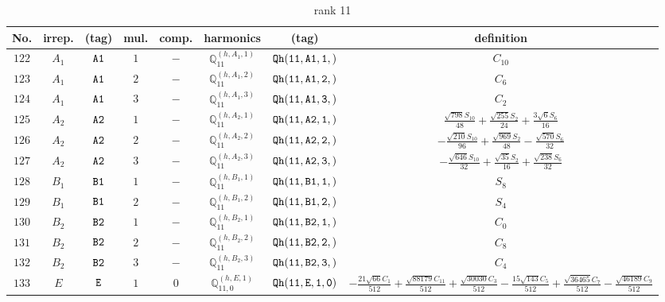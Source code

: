 \documentclass[fleqn,8pt]{jsarticle}
\begin{document}
\begin{table}[ht!]
\begin{center}
\caption{rank 11}
\renewcommand{\arraystretch}{1.3}
\begin{tabular}{cccccccc} \hline \hline
No. & irrep. & (tag) & mul. & comp. & harmonics & (tag) & definition \\ \hline
$ 122 $ & $ A_{1} $ & $ {\tt A1} $ & $ 1 $ & $ - $ & $ \mathbb{Q}_{11}^{(h,A_{1},1)} $ & $ {\tt Qh(11,A1,1,)} $ & $ C_{10} $ \\
$ 123 $ & $ A_{1} $ & $ {\tt A1} $ & $ 2 $ & $ - $ & $ \mathbb{Q}_{11}^{(h,A_{1},2)} $ & $ {\tt Qh(11,A1,2,)} $ & $ C_{6} $ \\
$ 124 $ & $ A_{1} $ & $ {\tt A1} $ & $ 3 $ & $ - $ & $ \mathbb{Q}_{11}^{(h,A_{1},3)} $ & $ {\tt Qh(11,A1,3,)} $ & $ C_{2} $ \\
$ 125 $ & $ A_{2} $ & $ {\tt A2} $ & $ 1 $ & $ - $ & $ \mathbb{Q}_{11}^{(h,A_{2},1)} $ & $ {\tt Qh(11,A2,1,)} $ & $ \frac{\sqrt{798} S_{10}}{48} + \frac{\sqrt{255} S_{2}}{24} + \frac{3 \sqrt{6} S_{6}}{16} $ \\
$ 126 $ & $ A_{2} $ & $ {\tt A2} $ & $ 2 $ & $ - $ & $ \mathbb{Q}_{11}^{(h,A_{2},2)} $ & $ {\tt Qh(11,A2,2,)} $ & $ - \frac{\sqrt{210} S_{10}}{96} + \frac{\sqrt{969} S_{2}}{48} - \frac{\sqrt{570} S_{6}}{32} $ \\
$ 127 $ & $ A_{2} $ & $ {\tt A2} $ & $ 3 $ & $ - $ & $ \mathbb{Q}_{11}^{(h,A_{2},3)} $ & $ {\tt Qh(11,A2,3,)} $ & $ - \frac{\sqrt{646} S_{10}}{32} + \frac{\sqrt{35} S_{2}}{16} + \frac{\sqrt{238} S_{6}}{32} $ \\
$ 128 $ & $ B_{1} $ & $ {\tt B1} $ & $ 1 $ & $ - $ & $ \mathbb{Q}_{11}^{(h,B_{1},1)} $ & $ {\tt Qh(11,B1,1,)} $ & $ S_{8} $ \\
$ 129 $ & $ B_{1} $ & $ {\tt B1} $ & $ 2 $ & $ - $ & $ \mathbb{Q}_{11}^{(h,B_{1},2)} $ & $ {\tt Qh(11,B1,2,)} $ & $ S_{4} $ \\
$ 130 $ & $ B_{2} $ & $ {\tt B2} $ & $ 1 $ & $ - $ & $ \mathbb{Q}_{11}^{(h,B_{2},1)} $ & $ {\tt Qh(11,B2,1,)} $ & $ C_{0} $ \\
$ 131 $ & $ B_{2} $ & $ {\tt B2} $ & $ 2 $ & $ - $ & $ \mathbb{Q}_{11}^{(h,B_{2},2)} $ & $ {\tt Qh(11,B2,2,)} $ & $ C_{8} $ \\
$ 132 $ & $ B_{2} $ & $ {\tt B2} $ & $ 3 $ & $ - $ & $ \mathbb{Q}_{11}^{(h,B_{2},3)} $ & $ {\tt Qh(11,B2,3,)} $ & $ C_{4} $ \\
$ 133 $ & $ E $ & $ {\tt E} $ & $ 1 $ & $ 0 $ & $ \mathbb{Q}_{11,0}^{(h,E,1)} $ & $ {\tt Qh(11,E,1,0)} $ & $ - \frac{21 \sqrt{66} C_{1}}{512} + \frac{\sqrt{88179} C_{11}}{512} + \frac{\sqrt{30030} C_{3}}{512} - \frac{15 \sqrt{143} C_{5}}{512} + \frac{\sqrt{36465} C_{7}}{512} - \frac{\sqrt{46189} C_{9}}{512} $ \\

\end{tabular}
\end{center}
\end{table}
\end{document}
